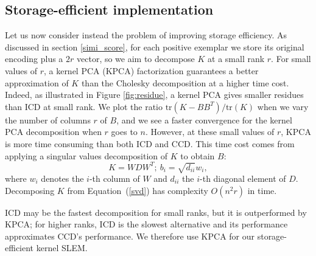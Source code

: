 \subsection{Storage-efficient implementation}\label{low-rank} %
Let us now consider instead the problem of improving storage efficiency. As discussed in section \ref{simi_score}, for each positive exemplar we store its original encoding plus a $2r$ vector, so we aim to decompose $K$ at a small rank $r$.
For small values of $r$, a kernel PCA (KPCA) factorization guarantees a better approximation of $K$ than the Cholesky decomposition at a higher time cost. Indeed, as illustrated in Figure \ref{fig:residue}, a kernel PCA gives smaller residues than ICD at small rank. We plot the ratio $\mathrm{tr}(K-BB^T)/\mathrm{tr}(K)$ when we vary the number of columns $r$ of $B$, and we see a faster convergence for the kernel PCA decomposition when $r$ goes to $n$. However, at these small values of $r$, KPCA is more time consuming than both ICD and CCD. This time cost comes from applying a singular values decomposition of $K$ to obtain $B$:
\begin{equation}
    K = WDW^T; \ b_i = \sqrt{d_{ii}}w_i, \label{svd}
\end{equation}
where $w_i$ denotes the $i$-th column of $W$ and $d_{ii}$ the $i$-th diagonal element of $D$. Decomposing $K$ from Equation~(\ref{svd}) has complexity $O(n^2r)$ in time. 

ICD may be the fastest decomposition for small ranks, but it is outperformed by KPCA; for higher ranks, ICD is the slowest alternative and its performance approximates CCD's performance. We therefore use KPCA for our storage-efficient kernel SLEM. %


